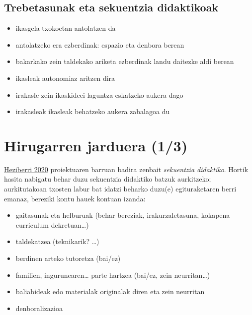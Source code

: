 \documentclass[]{book}
\providecommand{\tightlist}{%
  \setlength{\itemsep}{0pt}\setlength{\parskip}{0pt}}
\begin{document}
\hypertarget{trebetasunak-eta-sekuentzia-didaktikoak}{%
\section{Trebetasunak eta sekuentzia didaktikoak}\label{trebetasunak-eta-sekuentzia-didaktikoak}}

\begin{itemize}
\tightlist
\item
  ikasgela txokoetan antolatzen da
\item
  antolatzeko era ezberdinak: espazio eta denbora berean
\item
  bakarkako zein taldekako ariketa ezberdinak landu daitezke aldi berean
\item
  ikasleak autonomiaz aritzen dira
\item
  irakasle zein ikaskideei laguntza eskatzeko aukera dago
\item
  irakasleak ikasleak behatzeko aukera zabalagoa du
\end{itemize}

\hypertarget{hirugarren-jarduera-13}{%
\chapter*{Hirugarren jarduera (1/3)}\label{hirugarren-jarduera-13}}

\href{http://heziberri.berritzegunenagusia.eus/heziberri_eus/}{Heziberri 2020} proiektuaren barruan badira zenbait \emph{sekuentzia didaktiko}. Hortik hasita nabigatu behar duzu sekuentzia didaktiko batzuk aurkitzeko; aurkitutakoan txosten labur bat idatzi beharko duzu(e) egituraketaren berri emanaz, bereziki kontu hauek kontuan izanda:

\begin{itemize}
\tightlist
\item
  gaitasunak eta helburuak (behar bereziak, irakurzaletasuna, kokapena curriculum dekretuan\ldots{})
\item
  taldekatzea (teknikarik? \ldots{})
\item
  berdinen arteko tutoretza (bai/ez)
\item
  familien, ingurunearen\ldots{} parte hartzea (bai/ez, zein neurritan\ldots{})
\item
  baliabideak edo materialak originalak diren eta zein neurritan
\item
  denboralizazioa
\end{itemize}
\end{document}
